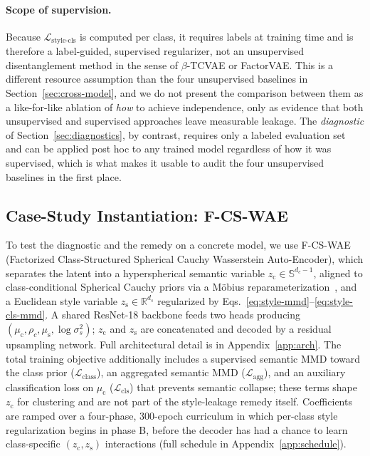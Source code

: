 \documentclass[10pt,letterpaper]{article}
\newcommand{\ours}{F-CS-WAE}
\newcommand{\zc}{z_{\mathrm{c}}}
\newcommand{\zs}{z_{\mathrm{s}}}
\newcommand{\muc}{\mu_{\mathrm{c}}}
\newcommand{\mus}{\mu_{\mathrm{s}}}
\newcommand{\Sph}{\mathbb{S}}
\newcommand{\R}{\mathbb{R}}
\begin{document}
\paragraph{Scope of supervision.}
Because $\mathcal{L}_{\mathrm{style\text{-}cls}}$ is computed per class, it
requires labels at training time and is therefore a label-guided,
supervised regularizer, not an unsupervised disentanglement method in the
sense of $\beta$-TCVAE or FactorVAE. This is a different resource
assumption than the four unsupervised baselines in
Section~\ref{sec:cross-model}, and we do not present the comparison between
them as a like-for-like ablation of \emph{how} to achieve independence, only
as evidence that both unsupervised and supervised approaches leave
measurable leakage. The \emph{diagnostic} of Section~\ref{sec:diagnostics},
by contrast, requires only a labeled evaluation set and can be applied
post hoc to any trained model regardless of how it was supervised, which is
what makes it usable to audit the four unsupervised baselines in the first
place.

\subsection{Case-Study Instantiation: \ours{}}
\label{sec:instantiation}

To test the diagnostic and the remedy on a concrete model, we use \ours{}
(Factorized Class-Structured Spherical Cauchy Wasserstein Auto-Encoder),
which separates the latent into a hyperspherical semantic variable
$\zc\in\Sph^{d_c-1}$, aligned to class-conditional Spherical Cauchy priors
via a M\"obius reparameterization~\citep{sablica2025hyperspherical}, and a
Euclidean style variable $\zs\in\R^{d_s}$ regularized by
Eqs.~\ref{eq:style-mmd}--\ref{eq:style-cls-mmd}. A shared ResNet-18
backbone feeds two heads producing $(\muc,\rho_c,\mus,\log\sigma_s^2)$;
$\zc$ and $\zs$ are concatenated and decoded by a residual upsampling
network. Full architectural detail is in Appendix~\ref{app:arch}. The total
training objective additionally includes a supervised semantic MMD toward
the class prior ($\mathcal{L}_{\mathrm{class}}$), an aggregated semantic MMD
($\mathcal{L}_{\mathrm{agg}}$), and an auxiliary classification loss on
$\muc$ ($\mathcal{L}_{\mathrm{cls}}$) that prevents semantic collapse; these
terms shape $\zc$ for clustering and are not part of the style-leakage
remedy itself. Coefficients are ramped over a four-phase, 300-epoch
curriculum in which per-class style regularization begins in phase B,
before the decoder has had a chance to learn class-specific
$(\zc,\zs)$ interactions (full schedule in Appendix~\ref{app:schedule}).
\end{document}

